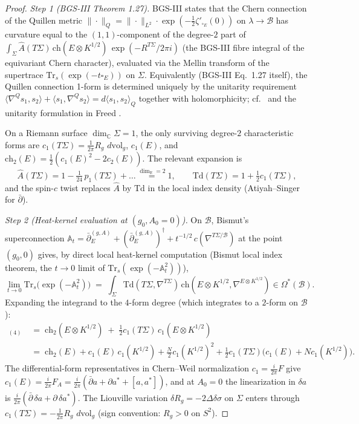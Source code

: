\documentclass[11pt,letterpaper]{article}
\theoremstyle{definition}
\newcommand{\bbR}{\mathbb{R}}
\newcommand{\bbC}{\mathbb{C}}
\newcommand{\Tr}{\mathrm{Tr}}
\newcommand{\dvol}{\,d\mathrm{vol}}
\begin{document}
\begin{proof}
\emph{Step 1 (BGS-III Theorem 1.27).} BGS-III \cite[Thm.\ 1.27]{BismutGilletSoule1988} states that the Chern connection of the Quillen metric $\|\cdot\|_Q = \|\cdot\|_{L^2} \cdot \exp(-\tfrac12 \zeta'_{{\square}_E}(0))$ on $\lambda \to \mathcal{B}$ has curvature equal to the $(1,1)$-component of the degree-$2$ part of $\int_{\Sigma}\widehat{A}(T\Sigma)\,\mathrm{ch}(E\otimes K^{1/2})\,\exp(-R^{T\Sigma}/2\pi i)$ (the BGS-III fibre integral of the equivariant Chern character), evaluated via the Mellin transform of the supertrace $\Tr_s(\exp(-t{\square}_E))$ on $\Sigma$. Equivalently (BGS-III Eq.\ 1.27 itself), the Quillen connection 1-form is determined uniquely by the unitarity requirement $\langle\nabla^Q s_1, s_2\rangle + \langle s_1, \nabla^Q s_2\rangle = d\langle s_1, s_2\rangle_Q$ together with holomorphicity; cf.\ \cite[Eq.\ (1.27) and the discussion in \S1.f]{BismutGilletSoule1988} and the unitarity formulation in Freed \cite[\S 1, Eq.\ following (1.27)]{Freed1987}.

On a Riemann surface $\dim_\bbC\Sigma = 1$, the only surviving degree-$2$ characteristic forms are $c_1(T\Sigma) = \tfrac{1}{2\pi}R_g\,\dvol_g$, $c_1(E)$, and $\mathrm{ch}_2(E) = \tfrac12(c_1(E)^2 - 2c_2(E))$. The relevant expansion is
\[
\widehat{A}(T\Sigma) = 1 - \tfrac{1}{24}\,p_1(T\Sigma) + \ldots \overset{\dim_\bbR = 2}{=} 1,\qquad \mathrm{Td}(T\Sigma) = 1 + \tfrac12 c_1(T\Sigma),
\]
and the spin-$c$ twist replaces $\widehat A$ by $\mathrm{Td}$ in the local index density (Atiyah--Singer for $\bar\partial$).

\emph{Step 2 (Heat-kernel evaluation at $(g_0, A_0 = 0)$).} On $\mathcal{B}$, Bismut's superconnection $\mathbb{A}_t = \bar\partial_E^{(g,A)} + (\bar\partial_E^{(g,A)})^\dagger + t^{-1/2}\,c(\nabla^{T\Sigma/\mathcal{B}})$ at the point $(g_0, 0)$ gives, by direct local heat-kernel computation (Bismut local index theorem, the $t\to 0$ limit of $\Tr_s(\exp(-\mathbb{A}_t^2))$),
\[
\lim_{t\to 0}\Tr_s\!\big(\exp(-\mathbb{A}_t^2)\big) \;=\; \int_{\Sigma}\mathrm{Td}(T\Sigma, \nabla^{T\Sigma})\,\mathrm{ch}(E\otimes K^{1/2}, \nabla^{E\otimes K^{1/2}}) \in \Omega^*(\mathcal{B}).
\]
Expanding the integrand to the $4$-form degree (which integrates to a $2$-form on $\mathcal{B}$):
\begin{align*}
[\mathrm{Td}\cdot\mathrm{ch}]_{(4)} \;&=\; \mathrm{ch}_2(E\otimes K^{1/2}) \;+\; \tfrac12 c_1(T\Sigma)\,c_1(E\otimes K^{1/2})\\
\;&=\; \mathrm{ch}_2(E) + c_1(E)\,c_1(K^{1/2}) + \tfrac N 2 c_1(K^{1/2})^2 + \tfrac12 c_1(T\Sigma)\big(c_1(E) + N c_1(K^{1/2})\big).
\end{align*}
The differential-form representatives in Chern--Weil normalization $c_1 = \tfrac{i}{2\pi}F$ give $c_1(E) = \tfrac{i}{2\pi}F_A = \tfrac{i}{2\pi}(\bar\partial a + \partial a^* + [a, a^*])$, and at $A_0 = 0$ the linearization in $\delta a$ is $\tfrac{i}{2\pi}(\bar\partial\,\delta a + \partial\,\delta a^*)$. The Liouville variation $\delta R_g = -2\Delta\delta\sigma$ on $\Sigma$ enters through $c_1(T\Sigma) = -\tfrac{1}{2\pi}R_g\,\dvol_g$ (sign convention: $R_g > 0$ on $S^2$).


\end{proof}
\end{document}
